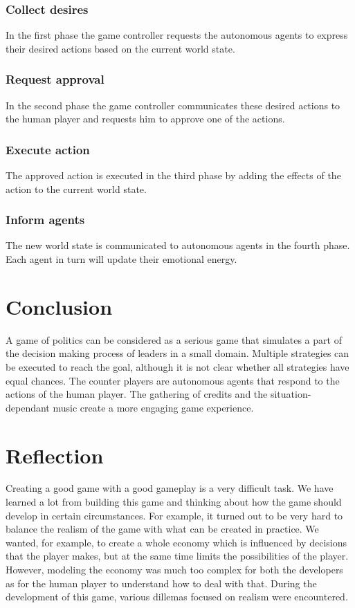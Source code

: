 \documentclass[11pt,a4paper]{article}
\begin{document}
    \subsubsection{Collect desires}
      In the first phase the game controller requests the autonomous agents to express their desired actions based on the current world state.
    \subsubsection{Request approval}
      In the second phase the game controller communicates these desired actions to the human player and requests him to approve one of the actions.
    \subsubsection{Execute action}
      The approved action is executed in the third phase by adding the effects of the action to the current world state.
    \subsubsection{Inform agents}
      The new world state is communicated to autonomous agents in the fourth phase. Each agent in turn will update their emotional energy. 

\section{Conclusion}
A game of politics can be considered as a serious game that simulates a part of the decision making process of leaders in a small domain. Multiple strategies can be executed to reach the goal, although it is not clear whether all strategies have equal chances. The counter players are autonomous agents that respond to the actions of the human player. The gathering of credits and the situation-dependant music create a more engaging game experience.

\section{Reflection}
Creating a good game with a good gameplay is a very difficult task. We have learned a lot from building this game and thinking about how the game should develop in certain circumstances. For example, it turned out to be very hard to balance the realism of the game with what can be created in practice. We wanted, for example, to create a whole economy which is influenced by decisions that the player makes, but at the same time limits the possibilities of the player. However, modeling the economy was much too complex for both the developers as for the human player to understand how to deal with that. During the development of this game, various dillemas focused on realism were encountered. 
\end{document}
